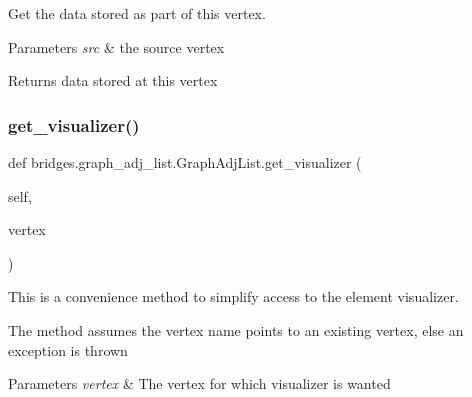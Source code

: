 Get the data stored as part of this vertex. 


\begin{DoxyParams}{Parameters}
{\em src} & the source vertex \\
\hline
\end{DoxyParams}
\begin{DoxyReturn}{Returns}
data stored at this vertex 
\end{DoxyReturn}
\mbox{\label{classbridges_1_1graph__adj__list_1_1_graph_adj_list_ad63fce416ec0fdfd99d05e6236807fd8}} 
\subsubsection{\texorpdfstring{get\+\_\+visualizer()}{get\_visualizer()}}
{\footnotesize\ttfamily def bridges.\+graph\+\_\+adj\+\_\+list.\+Graph\+Adj\+List.\+get\+\_\+visualizer (\begin{DoxyParamCaption}\item[{}]{self,  }\item[{}]{vertex }\end{DoxyParamCaption})}



This is a convenience method to simplify access to the element visualizer. 

The method assumes the vertex name points to an existing vertex, else an exception is thrown


\begin{DoxyParams}{Parameters}
{\em vertex} & The vertex for which visualizer is wanted \\
\hline
\end{DoxyParams}
\mbox{\label{classbridges_1_1graph__adj__list_1_1_graph_adj_list_a96e264e71acad7474e233a1ec1d1035a}} 
